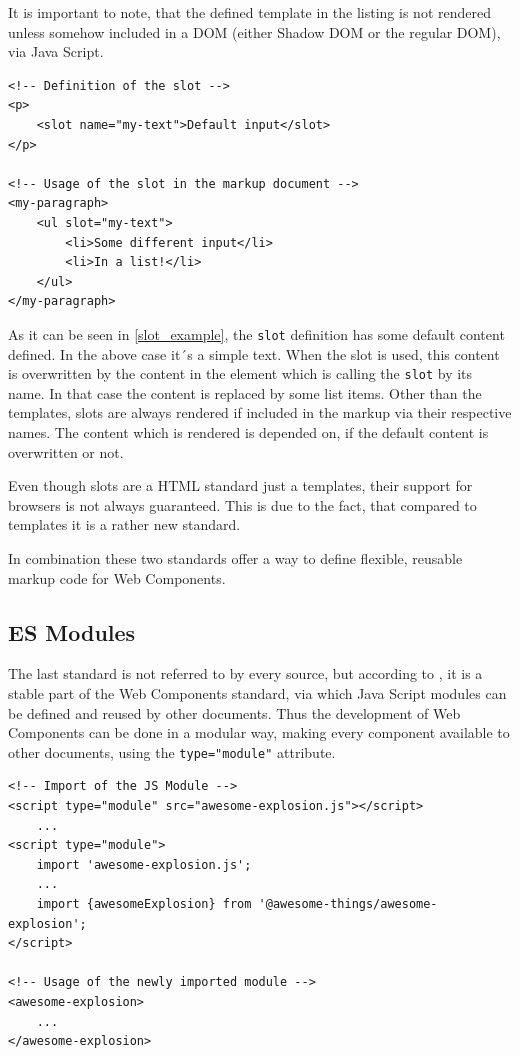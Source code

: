 It is important to note, that the defined template in the listing is not rendered unless somehow included in a DOM (either Shadow DOM or the regular DOM), via Java Script.

\begin{lstlisting}[language=HTML5, caption=Definition and usage of the \texttt{slot} standard \cite{wc_html_template_slots}, label=slot_example]
<!-- Definition of the slot -->
<p>
	<slot name="my-text">Default input</slot>
</p>

<!-- Usage of the slot in the markup document -->
<my-paragraph>
	<ul slot="my-text">
		<li>Some different input</li>
		<li>In a list!</li>
	</ul>
</my-paragraph>
\end{lstlisting}

As it can be seen in \ref{slot_example}, the \texttt{slot} definition has some default content defined. In the above case it´s a simple text. When the slot is used, this content is overwritten by the content in the element which is calling the \texttt{slot} by its name.
In that case the content is replaced by some list items.
Other than the templates, slots are always rendered if included in the markup via their respective names. The content which is rendered is depended on, if the default content is overwritten or not.

Even though slots are a HTML standard just a templates, their support for browsers is not always guaranteed. This is due to the fact, that compared to templates it is a rather new standard.

In combination these two standards offer a way to define flexible, reusable markup code for Web Components.\cite{wc_html_template_slots}

\subsection{ES Modules}

The last standard is not referred to by every source, but according to \cite{wc_specifications}, it is a stable part of the Web Components standard, via which Java Script modules can be defined and reused by other documents.
Thus the development of Web Components can be done in a modular way, making every component available to other documents, using the \texttt{type="module"} attribute.

\begin{lstlisting}[language=HTML5, caption=Importing modular Java Script documents into another \cite{wc_specifications}, label=es_modules_example]
<!-- Import of the JS Module -->
<script type="module" src="awesome-explosion.js"></script>
	...
<script type="module">
	import 'awesome-explosion.js';
	...
	import {awesomeExplosion} from '@awesome-things/awesome-explosion';
</script>

<!-- Usage of the newly imported module -->
<awesome-explosion>
	...
</awesome-explosion>
\end{lstlisting}

